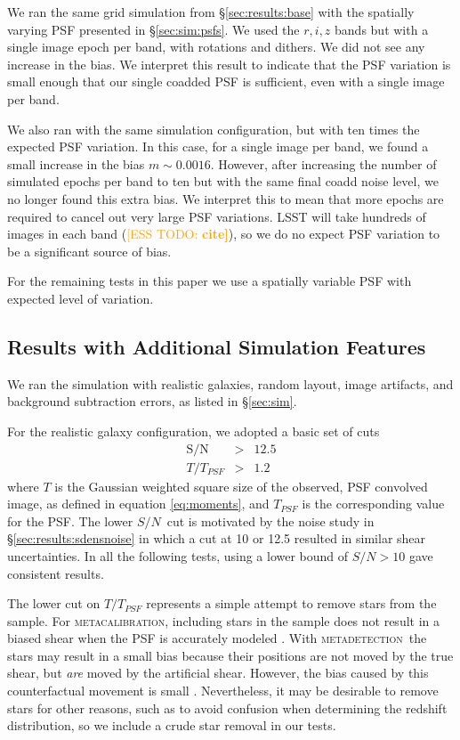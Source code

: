 \documentclass[twocolumn,twocolappendix,astrosym]{openjournal}
\newcommand{\esstodo}[1]{\textcolor{orange}{[ESS TODO: \bf #1]}}
\newcommand{\snr}{$S/N$}
\newcommand{\mcal}{\textsc{metacalibration}}
\newcommand{\mdet}{\textsc{metadetection}}
\begin{document}
We ran the same grid simulation from \S \ref{sec:results:base} with the
spatially varying PSF presented in \S \ref{sec:sim:psfs}. We used the $r, i, z$
bands but with a single image epoch per band, with rotations and dithers.  We
did not see any increase in the bias.   We interpret this result to indicate
that the PSF variation is small enough that our single coadded PSF is
sufficient, even with a single image per band.

We also ran with the same simulation configuration, but with ten times the
expected PSF variation. In this case, for a single image per band, we found a
small increase in the bias $m \sim 0.0016$.  However, after increasing the
number of simulated epochs per band to ten but with the same final coadd noise
level, we no longer found this extra bias.  We interpret this to mean that more
epochs are required to cancel out very large PSF variations.  LSST will take
hundreds of images in each band (\esstodo{cite}), so we do no expect PSF
variation to be a significant source of bias.

For the remaining tests in this paper we use a spatially variable PSF with
expected level of variation.

\subsection{Results with Additional Simulation Features} \label{sec:results:more}

We ran the simulation with realistic galaxies, random layout, image
artifacts, and background subtraction errors, as listed in \S \ref{sec:sim}.

For the realistic galaxy configuration, we adopted a basic set of cuts
\begin{eqnarray} \label{eq:basiccuts}
    \mathrm{S/N} & > & 12.5 \\
    T/T_{PSF} & > & 1.2
\end{eqnarray}
where $T$ is the Gaussian weighted square size of the observed, PSF convolved
image, as defined in equation \ref{eq:moments}, and $T_{PSF}$ is the
corresponding value for the PSF.  The lower \snr\ cut is motivated by the noise
study in \S \ref{sec:results:sdensnoise} in which a cut at 10 or 12.5 resulted
in similar shear uncertainties.  In all the following tests, using a lower
bound of $S/N > 10$ gave consistent results.

The lower cut on $T/T_{PSF}$ represents a simple attempt to remove stars from
the sample.  For \mcal, including stars in the sample does not result in a
biased shear when the PSF is accurately modeled \citep{SheldonMcal2017}.  With
\mdet\ the stars may result in a small bias because their positions are not
moved by the true shear, but {\it are} moved by the artificial shear. However,
the bias caused by this counterfactual movement is small \citep{mdet20}.
Nevertheless, it may be desirable to remove stars for other reasons, such as to
avoid confusion when determining the redshift distribution, so we include a
crude star removal in our tests.
\end{document}
